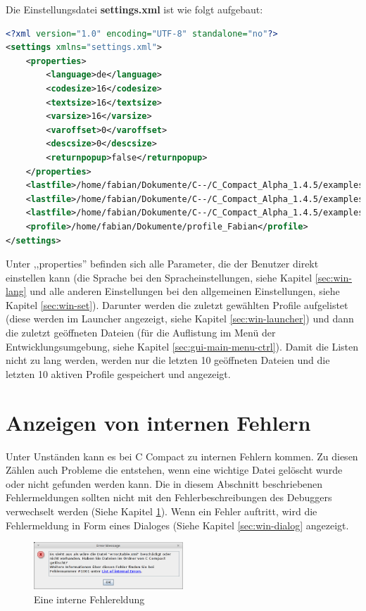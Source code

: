 Die Einstellungsdatei \textbf{settings.xml} ist wie folgt aufgebaut:
\begin{lstlisting}[language=XML]
<?xml version="1.0" encoding="UTF-8" standalone="no"?>
<settings xmlns="settings.xml">
	<properties>
		<language>de</language>
		<codesize>16</codesize>
		<textsize>16</textsize>
		<varsize>16</varsize>
		<varoffset>0</varoffset>
		<descsize>0</descsize>
		<returnpopup>false</returnpopup>
	</properties>
	<lastfile>/home/fabian/Dokumente/C--/C_Compact_Alpha_1.4.5/examples/helloworld/helloworld.cmm</lastfile>
	<lastfile>/home/fabian/Dokumente/C--/C_Compact_Alpha_1.4.5/examples/random/random.cmm</lastfile>
	<lastfile>/home/fabian/Dokumente/C--/C_Compact_Alpha_1.4.5/examples/bubblesort/bubblesort.cmm</lastfile>
	<profile>/home/fabian/Dokumente/profile_Fabian</profile>
</settings>
\end{lstlisting}

Unter ,,properties'' befinden sich alle Parameter, die der Benutzer direkt einstellen kann (die Sprache bei den Spracheinstellungen, siehe Kapitel \ref{sec:win-lang} und alle anderen Einstellungen bei den allgemeinen Einstellungen, siehe Kapitel \ref{sec:win-set}). Darunter werden die zuletzt gewählten Profile aufgelistet (diese werden im Launcher angezeigt, siehe Kapitel \ref{sec:win-launcher}) und dann die zuletzt geöffneten Dateien (für die Auflistung im Menü der Entwicklungsumgebung, siehe Kapitel \ref{sec:gui-main-menu-ctrl}). Damit die Listen nicht zu lang werden, werden nur die letzten 10 geöffneten Dateien und die letzten 10 aktiven Profile gespeichert und angezeigt.

\section{Anzeigen von internen Fehlern}
Unter Unständen kann es bei C Compact zu internen Fehlern kommen. Zu diesen Zählen auch Probleme die entstehen, wenn eine wichtige Datei gelöscht wurde oder nicht gefunden werden kann. Die in diesem Abschnitt beschriebenen Fehlermeldungen sollten nicht mit den Fehlerbeschreibungen des Debuggers verwechselt werden (Siehe Kapitel \ref{}). Wenn ein Fehler auftritt, wird die Fehlermeldung in Form eines Dialoges (Siehe Kapitel \ref{sec:win-dialog} angezeigt.

\begin{figure}[htp]
\centering
\includegraphics[width=0.5\textwidth]{./media/images/gui/elements/Bildschirmfoto-Error-Message.png}
\caption{Eine interne Fehlereldung}
\end{figure}

